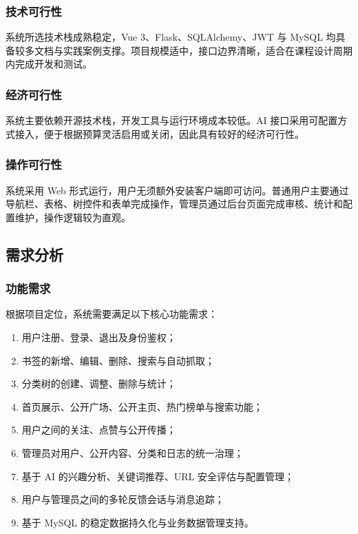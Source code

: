 \documentclass[12pt,a4paper]{ctexart}
\begin{document}
\subsubsection{技术可行性}
系统所选技术栈成熟稳定，Vue 3、Flask、SQLAlchemy、JWT 与 MySQL 均具备较多文档与实践案例支撑。项目规模适中，接口边界清晰，适合在课程设计周期内完成开发和测试。

\subsubsection{经济可行性}
系统主要依赖开源技术栈，开发工具与运行环境成本较低。AI 接口采用可配置方式接入，便于根据预算灵活启用或关闭，因此具有较好的经济可行性。

\subsubsection{操作可行性}
系统采用 Web 形式运行，用户无须额外安装客户端即可访问。普通用户主要通过导航栏、表格、树控件和表单完成操作，管理员通过后台页面完成审核、统计和配置维护，操作逻辑较为直观。

\subsection{需求分析}
\subsubsection{功能需求}
根据项目定位，系统需要满足以下核心功能需求：

\begin{enumerate}[label=\arabic.]
    \item 用户注册、登录、退出及身份鉴权；
    \item 书签的新增、编辑、删除、搜索与自动抓取；
    \item 分类树的创建、调整、删除与统计；
    \item 首页展示、公开广场、公开主页、热门榜单与搜索功能；
    \item 用户之间的关注、点赞与公开传播；
    \item 管理员对用户、公开内容、分类和日志的统一治理；
    \item 基于 AI 的兴趣分析、关键词推荐、URL 安全评估与配置管理；
    \item 用户与管理员之间的多轮反馈会话与消息追踪；
    \item 基于 MySQL 的稳定数据持久化与业务数据管理支持。
\end{enumerate}
\end{document}
